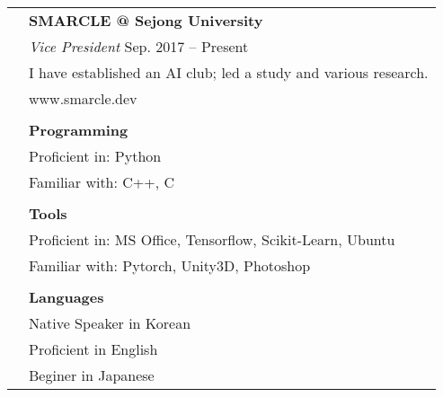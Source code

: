 \documentclass[letterpaper, 11pt]{article}
\begin{document}
\begin{longtable}{p{1.3in}p{4.8in}}
\nohyphens{\color{Violet}{Club Activities}}
& \textbf{SMARCLE @ Sejong University} \\
& {\it Vice President} \hfill Sep. 2017 -- Present \\
& I have established an AI club; led a study and various research. \\
& www.smarcle.dev\\
& \\

{\color{Violet}{Skills}} 
& \textbf{Programming}\\
& Proficient in: Python \\
& Familiar with: C++, C \\
& \\
& \textbf{Tools}\\
& Proficient in: MS Office, Tensorflow, Scikit-Learn, Ubuntu \\
& Familiar with: Pytorch, Unity3D, Photoshop \\
& \\
& \textbf{Languages} \\
& Native Speaker in Korean\\
& Proficient in English \\
& Beginer in Japanese\\


\end{longtable}
\end{document}
